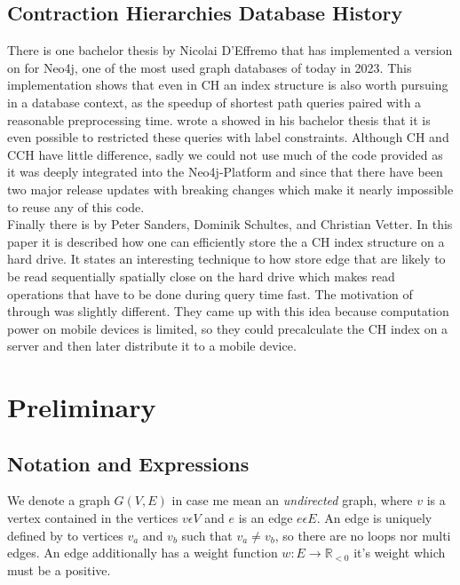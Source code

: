 \documentclass[11pt, rgb]{scrreprt}
\begin{document}
\section{Contraction Hierarchies Database History}\label{sec:related_work:database}

There is one bachelor thesis by Nicolai D'Effremo \cite[Some text]{DEffremo2019} that has implemented a version on \cite[Contraction Hierarchies]{Geisberger_2012} for Neo4j, one 
of the most used graph databases of today in 2023. This implementation shows that even in CH an index structure is also worth pursuing in a database context, as the speedup 
of shortest path queries paired with a reasonable preprocessing time. \cite{Zickenberg2021} wrote a showed in his bachelor thesis that it is even possible to restricted these
queries with label constraints. Although CH and CCH have little difference, sadly we could not use much of the code provided as it
was deeply integrated into the Neo4j-Platform and since that there have been two major release updates with breaking changes which make it nearly impossible to reuse any of
this code.\\

Finally there is \cite[Mobile Route Planning]{Sanders} by Peter Sanders, Dominik Schultes, and Christian Vetter. In this paper it is described how one can efficiently store
the a CH index structure on a hard drive. It states an interesting technique to how store edge that are likely to be read sequentially spatially close on the hard drive which 
makes read operations that have to be done during query time fast. The motivation of \cite[Mobile Route Planning]{Sanders} through was slightly different. They came up with this
idea because computation power on mobile devices is limited, so they could precalculate the CH index on a server and then later distribute it to a mobile device.

\chapter{Preliminary}

\section{Notation and Expressions}
We denote a graph $G(V, E)$ in case me mean an \textit{undirected} graph, where $v$ is a vertex contained in the vertices $v \epsilon  V$ and $e$ is an edge $e \epsilon E$. An edge is uniquely defined by to vertices $v_a$ and $v_b$ such that $v_a \neq v_b$, so there are no loops nor multi edges. An edge additionally has a weight function $w: E \rightarrow \mathbb{R}_{<0} $ it's weight which must be a positive. 
\end{document}

